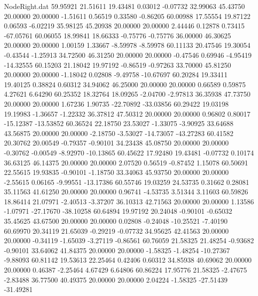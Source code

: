\begin{filecontents}{NodeRight.dat}
  59.95921   21.51611   19.43481     0.03012   -0.07732   32.99063   45.43750   20.00000   20.00000   -1.51611    0.56519    0.33580   -0.86205
  60.00988   17.55554   19.87122     0.06593   -6.02219   35.98125   45.20938   20.00000   20.00000    2.44446    0.12878    0.73415  -67.05761
  60.06055   18.99841   18.66333    -0.75776   -0.75776   36.00000   46.30625   20.00000   20.00000    1.00159    1.33667   -8.59978   -8.59978
  60.11133   20.47546   19.30054    -0.43544   -1.25913   34.72500   46.31250   20.00000   20.00000   -0.47546    0.69946   -4.95419  -14.32555
  60.15203   21.18042   19.97192    -0.86519   -0.97263   33.70000   45.81250   20.00000   20.00000   -1.18042    0.02808   -9.49758  -10.67697
  60.20284   19.33411   19.40125     0.38824    0.60312   34.94062   46.25000   20.00000   20.00000    0.66589    0.59875    4.27621    6.64290
  60.25352   18.32764   18.09265    -2.04700   -2.97813   36.35938   47.73750   20.00000   20.00000    1.67236    1.90735  -22.70892  -33.03856
  60.29422   19.03198   19.19983    -1.36657   -1.22332   36.37812   47.50312   20.00000   20.00000    0.96802    0.80017  -15.12387  -13.53852
  60.36524   22.18750   23.53027    -1.33075   -3.90925   33.64688   43.56875   20.00000   20.00000   -2.18750   -3.53027  -14.73057  -43.27283
  60.41582   20.30762   20.00549    -0.79357   -0.90101   34.23438   45.08750   20.00000   20.00000   -0.30762   -0.00549   -8.92970  -10.13865
  60.45622   17.92480   19.43481    -0.07732    0.10174   36.63125   46.14375   20.00000   20.00000    2.07520    0.56519   -0.87452    1.15078
  60.50691   22.55615   19.93835    -0.90101   -1.18750   33.34063   45.93750   20.00000   20.00000   -2.55615    0.06165   -9.99551  -13.17386
  60.55746   19.03259   24.53735     0.31662    0.28081   35.11563   41.61250   20.00000   20.00000    0.96741   -4.53735    3.51344    3.11603
  60.59826   18.86414   21.07971    -2.40513   -3.37207   36.10313   42.71563   20.00000   20.00000    1.13586   -1.07971  -27.17670  -38.10258
  60.64894   19.97192   20.24048    -0.90101   -0.65032   35.45625   43.67500   20.00000   20.00000    0.02808   -0.24048  -10.25521   -7.40190
  60.69970   20.34119   21.65039    -0.29219   -0.07732   34.95625   42.41563   20.00000   20.00000   -0.34119   -1.65039   -3.27119   -0.86561
  60.76059   21.58325   21.48254    -0.93682   -0.90101   33.64062   41.84375   20.00000   20.00000   -1.58325   -1.48254  -10.27367   -9.88093
  60.81142   19.53613   22.25464     0.42406    0.60312   34.85938   40.69062   20.00000   20.00000    0.46387   -2.25464    4.67429    6.64806
  60.86224   17.95776   21.58325    -2.47675   -2.83488   36.77500   40.49375   20.00000   20.00000    2.04224   -1.58325  -27.51439  -31.49281

\end{filecontents}
